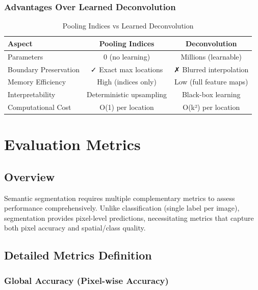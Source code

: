 \documentclass[11pt,a4paper]{report}
\begin{document}
\subsection*{Advantages Over Learned Deconvolution}

\begin{table}[H]
\centering
\caption{Pooling Indices vs Learned Deconvolution}
\small
\begin{tabular}{lcc}
\toprule
\rowcolor{tableheader}
\textbf{Aspect} & \textbf{Pooling Indices} & \textbf{Deconvolution} \\
\midrule
Parameters & 0 (no learning) & Millions (learnable) \\
Boundary Preservation & ✓ Exact max locations & ✗ Blurred interpolation \\
Memory Efficiency & High (indices only) & Low (full feature maps) \\
Interpretability & Deterministic upsampling & Black-box learning \\
Computational Cost & O(1) per location & O(k²) per location \\
\bottomrule
\end{tabular}
\end{table}

\chapter{Evaluation Metrics}

\section{Overview}

Semantic segmentation requires multiple complementary metrics to assess performance comprehensively. Unlike classification (single label per image), segmentation provides pixel-level predictions, necessitating metrics that capture both pixel accuracy and spatial/class quality.

\section{Detailed Metrics Definition}

\subsection{Global Accuracy (Pixel-wise Accuracy)}
\end{document}
